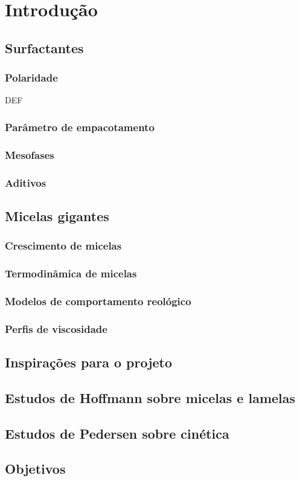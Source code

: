
\part{Introdução}
	\chapter{Surfactantes}
	\lipsum[1-20]
		\section{Polaridade}
		DEF
		\section{Parâmetro de empacotamento}
		\section{Mesofases}
		\section{Aditivos}
	\chapter{Micelas gigantes}
		\section{Crescimento de micelas}
		\section{Termodinâmica de micelas}
		\section{Modelos de comportamento reológico}
		\section{Perfis de viscosidade}
	\chapter{Inspirações para o projeto}
		\chapter{Estudos de Hoffmann sobre micelas e lamelas}
		\chapter{Estudos de Pedersen sobre cinética}
	\chapter{Objetivos}

